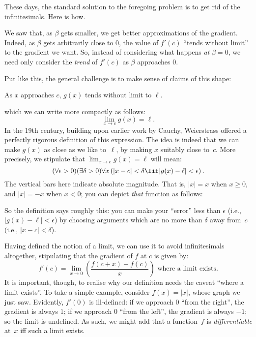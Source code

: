 \documentclass[../../../include/open-logic-section]{subfiles}
\begin{document}
	
	
These days, the standard solution to the foregoing problem is to get
rid of the infinitesimals. Here is how. 

We saw that, as $\beta$ gets smaller, we get better approximations of
the gradient. Indeed, as $\beta$ gets arbitrarily close to $0$, the
value of $f'(c)$ ``tends without limit'' to the gradient we want. So,
instead of considering what happens \emph{at} $\beta = 0$, we need
only consider the \emph{trend} of $f'(c)$ as $\beta$ approaches $0$. 

Put like this, the general challenge is to make sense of claims of
this shape:
\begin{center}
As $x$ approaches $c$, $g(x)$ tends without limit to $\ell$. 
\end{center}
which we can write more compactly as follows:
\[
\lim_{x \rightarrow c}g(x) = \ell.
\]
In the 19th century, building upon earlier work by Cauchy, Weierstrass
offered a perfectly rigorous definition of this expression. The idea
is indeed that we can make $g(x)$ as close as we like to~$\ell$, by
making $x$ suitably close to~$c$. More precisely, we stipulate that
$\lim_{x \rightarrow c} g(x) = \ell$ will mean:
\[
(\forall\epsilon > 0)(\exists \delta > 0)\forall x \left(|x - c| < \delta \lif |g(x) - \ell| < \epsilon \right).
\]
The vertical bars here indicate absolute magnitude. That is, $|x| = x$
when $x \geq 0$, and $|x| =-x$ when $x < 0$; you can depict
\emph{that} function as follows:
\begin{center}
\end{center}
So the definition says roughly this: you can make your ``error'' less
than $\epsilon$ (i.e., $|g(x) - \ell| < \epsilon$) by choosing
arguments which are no more than $\delta$ away from~$c$ (i.e., $|x -
c| < \delta$). 

Having defined the notion of a limit, we can use it to avoid
infinitesimals altogether, stipulating that the gradient of $f$ at $c$
is given by:
\[
	{f}'(c) = \lim_{x \rightarrow 0}\left(\frac{f(c +x) - f(c)}{x}\right) \text{ where a limit exists}.
\]
It is important, though, to realise why our definition needs the
caveat ``where a limit exists''. To take a simple example, consider
$f(x) = |x|$, whose graph we just saw. Evidently, $f'(0)$ is
ill-defined: if we approach $0$ ``from the right'', the gradient is
always $1$; if we approach $0$ ``from the left'', the gradient is
always $-1$; so the limit is undefined. As such, we might add that a
function~$f$ is \emph{differentiable} at~$x$ iff such a limit exists.
\end{document}
